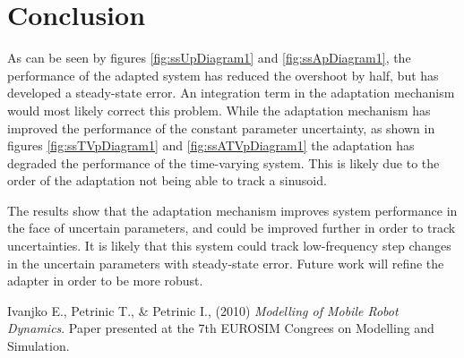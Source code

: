 \documentclass[letterpaper,12pt]{report}
\begin{document}
\chapter{Conclusion}
As can be seen by figures \ref{fig:ssUpDiagram1} and \ref{fig:ssApDiagram1}, the performance of the adapted system has reduced the overshoot by half, 
but has developed a steady-state error. An integration term in the adaptation mechanism would most likely correct this problem.
While the adaptation mechanism has improved the performance of the constant parameter uncertainty, as shown in figures \ref{fig:ssTVpDiagram1} and
\ref{fig:ssATVpDiagram1} the adaptation has degraded the performance of the time-varying system. This is likely due to the order of the adaptation not being
able to track a sinusoid.

The results show that the adaptation mechanism improves system performance in the face of uncertain parameters, and could be improved further in order
to track uncertainties. It is likely that this system could track low-frequency step changes in the uncertain parameters with steady-state error. 
Future work will refine the adapter in order to be more robust.


\begin{thebibliography}{9}

  Ivanjko E., Petrinic T., \& Petrinic I.,
  (2010)
  \emph{Modelling of Mobile Robot Dynamics}.
  Paper presented at the 7th EUROSIM Congrees on Modelling and Simulation. 

\end{thebibliography}
\end{document}
